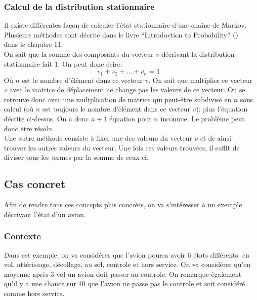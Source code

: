 \documentclass[letterpaper]{article}
\begin{document}
    \subsubsection{Calcul de la distribution stationnaire}
      \label{etat_stationnaire}
      Il existe différentes façon de calculer l'état stationnaire d'une chaine de Markov.
      Plusieurs méthodes sont décrite dans le livre ``Introduction to Probability'' (\citep{IP}) 
      dans le chapitre 11.\\
      On sait que la somme des composants du vecteur $v$ décrivant la distribution stationnaire 
      fait 1.  On peut donc écire:
      $$v_1 + v_2 + ... + v_n = 1$$
      Où $n$ est le nombre d'élément dans ce vecteur $v$.  On sait que multiplier ce vecteur $v$
      avec le matrice de déplacement ne change pas les valeurs de ce vecteur.  On se retrouve donc
      avec une multplication de matrice qui peut-être subdivisé en $n$ sous calcul (où $n$ est 
      toujours le nombre d'élément dans ce vecteur $v$); plus l'équation décrite ci-dessus.  On a 
      donc $n+1$ équation pour $n$ inconnue.  Le problème peut donc être résolu.\\
      Une autre méthode consiste à fixer une des valeurs du vecteur $v$ et de ainsi trouver les 
      autres valeurs du vecteur.  Une fois ces valeurs trouvées, il suffit de diviser tous les 
      termes par la somme de ceux-ci.
  
  \subsection{Cas concret}
    \label{casconcret}
    Afin de rendre tous ces concepts plus concrèts, on va s'intéresser à un exemple décrivant
    l'état d'un avion.
    
    \subsubsection{Contexte}
      Dans cet exemple, on va considérer que l'avion pourra avoir 6 états différents: en vol,
      attérissage, décollage, au sol, controle et hors service.  On va considérer qu'en moyenne
      après 3 vol un avion doit passer au controle.  On remarque également qu'il y a une chance
      sur 10 que l'avion ne passe pas le controle et soit considéré comme hors service.
      
\end{document}
